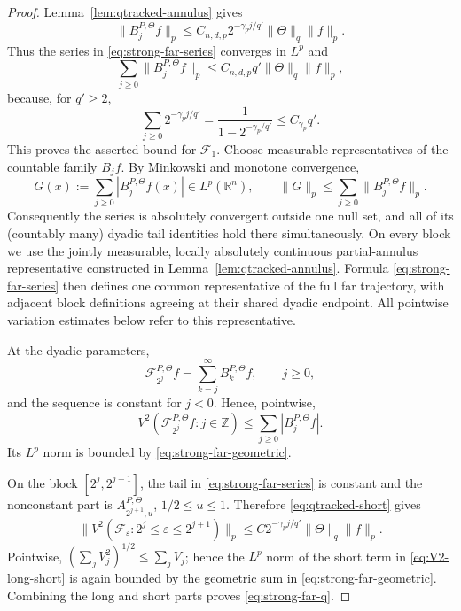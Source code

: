 \documentclass[11pt]{article}
\numberwithin{equation}{section}
\theoremstyle{remark}
\theoremstyle{definition}
\newcommand{\R}{\mathbb R}
\newcommand{\cF}{\mathcal F}
\newcommand{\norm}[1]{\lVert #1\rVert}
\begin{document}
\begin{proof}
Lemma~\ref{lem:qtracked-annulus} gives
\begin{equation}\label{eq:strong-far-Bj-decay}
 \norm{B_j^{P,\Theta}f}_p
 \leq C_{n,d,p}2^{-\gamma_pj/q'}
 \norm\Theta_q\norm f_p.
\end{equation}
Thus the series in \eqref{eq:strong-far-series} converges in $L^p$ and
\begin{equation}\label{eq:strong-far-geometric}
 \sum_{j\geq0}\norm{B_j^{P,\Theta}f}_p
 \leq C_{n,d,p}q'\norm\Theta_q\norm f_p,
\end{equation}
because, for $q'\geq2$,
\[
 \sum_{j\geq0}2^{-\gamma_pj/q'}
 =\frac1{1-2^{-\gamma_p/q'}}\leq C_{\gamma_p}q'.
\]
This proves the asserted bound for $\cF_1$.
Choose measurable representatives of the countable family $B_jf$.  By
Minkowski and monotone convergence,
\[
 G(x):=\sum_{j\ge0}|B_j^{P,\Theta}f(x)|\in L^p(\R^n),
 \qquad \norm G_p\le\sum_{j\ge0}\norm{B_j^{P,\Theta}f}_p.
\]
Consequently the series is absolutely convergent outside one null set,
and all of its (countably many) dyadic tail identities hold there
simultaneously.  On every block we use the jointly measurable,
locally absolutely continuous partial-annulus representative constructed
in Lemma~\ref{lem:qtracked-annulus}.  Formula
\eqref{eq:strong-far-series} then defines one common representative of the
full far trajectory, with adjacent block definitions agreeing at their
shared dyadic endpoint.  All pointwise variation estimates below refer to
this representative.

At the dyadic parameters,
\[
 \cF^{P,\Theta}_{2^j}f=\sum_{k=j}^\infty B_k^{P,\Theta}f,
 \qquad j\geq0,
\]
and the sequence is constant for $j<0$.  Hence, pointwise,
\begin{equation}\label{eq:strong-far-long}
 V^2(\cF^{P,\Theta}_{2^j}f:j\in\mathbb Z)
 \leq\sum_{j\geq0}|B_j^{P,\Theta}f|.
\end{equation}
Its $L^p$ norm is bounded by \eqref{eq:strong-far-geometric}.

On the block $[2^j,2^{j+1}]$, the tail in
\eqref{eq:strong-far-series} is constant and the nonconstant part is
$A^{P,\Theta}_{2^{j+1},u}$, $1/2\leq u\leq1$.  Therefore
\eqref{eq:qtracked-short} gives
\[
 \norm{V^2(\cF_\varepsilon:2^j\leq\varepsilon\leq2^{j+1})}_p
 \leq C2^{-\gamma_pj/q'}\norm\Theta_q\norm f_p.
\]
Pointwise,
$(\sum_j V_j^2)^{1/2}\leq\sum_jV_j$; hence the $L^p$ norm of the
short term in \eqref{eq:V2-long-short} is again bounded by the geometric
sum in \eqref{eq:strong-far-geometric}.  Combining the long and short
parts proves \eqref{eq:strong-far-q}.
\end{proof}
\end{document}
